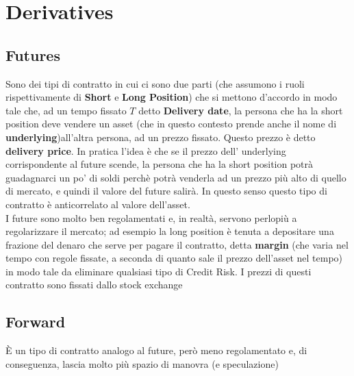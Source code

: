 \documentclass[a4paper,12pt]{article}
\theoremstyle{plain}
\theoremstyle{definition}
\theoremstyle{remark}
\begin{document}
\section{Derivatives}
\subsection{Futures}
Sono dei tipi di contratto in cui ci sono due parti (che assumono i ruoli rispettivamente di \textbf{Short} e \textbf{Long Position}) che si mettono d'accordo in modo tale che, ad un tempo fissato $T$ detto \textbf{Delivery date}, la persona che ha la short position deve vendere un asset (che in questo contesto prende anche il nome di \textbf{underlying})all'altra persona, ad un prezzo fissato.
Questo prezzo è detto \textbf{delivery price}.
In pratica l'idea è che se il prezzo dell' underlying corrispondente al future scende, la persona che ha la short position potrà guadagnarci un po' di soldi perchè potrà venderla ad un prezzo più alto di quello di mercato, e quindi il valore del future salirà. In questo senso questo tipo di contratto è anticorrelato al valore dell'asset.\\I future sono molto ben regolamentati e, in realtà, servono perlopiù a regolarizzare il mercato; ad esempio la long position è tenuta a depositare  una frazione del denaro che serve per pagare il contratto, detta \textbf{margin} (che varia nel tempo con regole fissate, a seconda di quanto sale il prezzo dell'asset nel tempo) in modo tale da eliminare qualsiasi tipo di Credit Risk. I prezzi di questi contratto sono fissati dallo stock exchange
\subsection{Forward}
È un tipo di contratto  analogo al future, però meno regolamentato e, di conseguenza, lascia molto più spazio di manovra (e speculazione)
\end{document}
